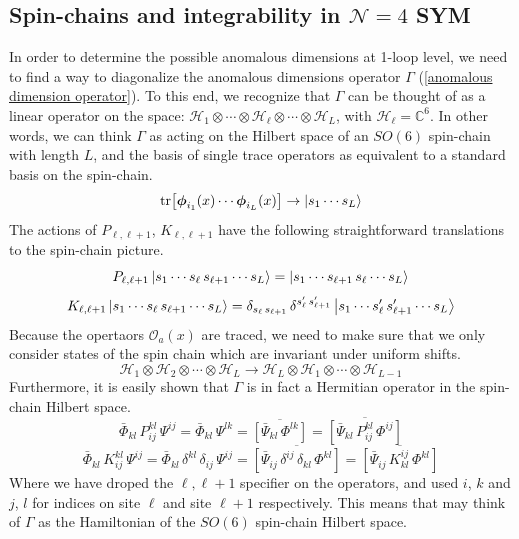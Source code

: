 \subsection{Spin-chains and integrability in $\mathcal{N}=4$ SYM}
In order to determine the possible anomalous dimensions at 1-loop level, we need to find a way to diagonalize the anomalous dimensions operator $\Gamma$ (\ref{anomalous dimension operator}). To this end, we recognize that $\Gamma$ can be thought of as a linear operator on the space: $\mathcal{H}_1 \otimes \cdots \otimes \mathcal{H}_\ell \otimes \cdots \otimes \mathcal{H}_L$, with $\mathcal{H}_\ell = \mathbb{C}^6$. In other words, we can think $\Gamma$ as acting on the Hilbert space of an $SO(6)$ spin-chain with length $L$, and the basis of single trace operators as equivalent to a standard basis on the spin-chain. 
%
%
\begin{equation}
\tr[ \boldsymbol{\phi}_{i_1}(x) \cdots \boldsymbol{\phi}_{i_L}(x) ]
\to
\ket{s_1 \cdots s_L}
\end{equation}
%
%
The actions of $P_{\ell, \ell+1}$, $K_{\ell, \ell+1}$ have the following straightforward translations to the spin-chain picture.
%
%
\begin{equation}
P_{\ell, \ell+1} \ket{s_1 \cdots s_\ell \, s_{\ell+1} \cdots s_L}
=
\ket{s_1 \cdots s_{\ell+1} \, s_\ell \cdots s_L}
\end{equation}
%
%
\begin{equation}
K_{\ell, \ell+1} \ket{s_1 \cdots s_\ell \, s_{\ell+1} \cdots s_L}
=
\delta_{s_\ell \, s_{\ell+1}} \, \delta^{s'_\ell \, s'_{\ell+1}}
\ket{s_1 \cdots s'_\ell \, s'_{\ell+1} \cdots s_L}
\end{equation}
%
%
Because the opertaors $\mathcal{O}_a(x)$ are traced, we need to make sure that we only consider states of the spin chain which are invariant under uniform shifts.
%
%
\begin{equation}\label{Uniform shift invariance}
\mathcal{H}_1 \otimes \mathcal{H}_2 \otimes \cdots \otimes \mathcal{H}_L
\to
\mathcal{H}_L \otimes \mathcal{H}_1 \otimes \cdots \otimes \mathcal{H}_{L-1}
\end{equation}
%
%
Furthermore, it is easily shown that $\Gamma$ is in fact a Hermitian operator in the spin-chain Hilbert space.
%
%
\begin{equation}
\bar{\Phi}_{kl} \, P^{kl}_{ij} \, \Psi^{ij}
=
\bar{\Phi}_{kl} \, \Psi^{lk}
=
\overline{
\left[
\bar{\Psi}_{kl} \, \Phi^{lk}
\right]
}
=
\overline{
\left[
\bar{\Psi}_{kl} \, P^{kl}_{ij} \, \Phi^{ij}
\right]
}
\end{equation}
%
%
\begin{equation}
\bar{\Phi}_{kl} \, K^{kl}_{ij} \, \Psi^{ij}
=
\bar{\Phi}_{kl} \, \delta^{kl} \, \delta_{ij} \, \Psi^{ij}
=
\overline{
\left[
\bar{\Psi}_{ij} \, \delta^{ij} \, \delta_{kl} \, \Phi^{kl}
\right]
}
=
\overline{
\left[
\bar{\Psi}_{ij} \, K^{ij}_{kl} \, \Phi^{kl}
\right]
}
\end{equation}
%
%
Where we have droped the $\ell, \ell+1$ specifier on the operators, and used $i$, $k$ and $j$, $l$ for indices on site $\ell$ and site $\ell+1$ respectively. This means that may think of $\Gamma$ as the Hamiltonian of the $SO(6)$ spin-chain Hilbert space.

